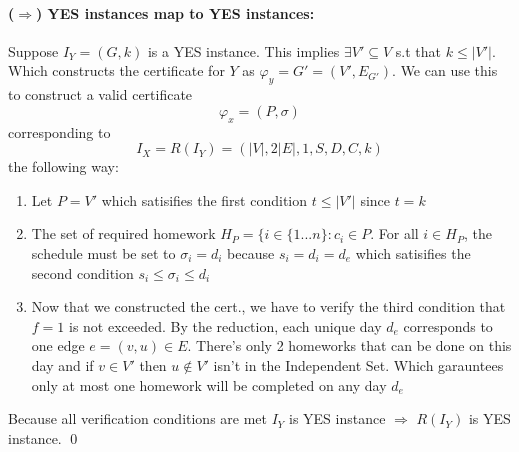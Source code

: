 \documentclass[11pt]{article}
\begin{document}
\paragraph{($\Rightarrow$) YES instances map to YES instances:}
Suppose $I_Y = (G,k)$ is a YES instance. This implies $\exists V' \subseteq V$ s.t that $k \leq |V'|$. Which constructs
the certificate for $Y$ as $\varphi_y = G' = (V', E_{G'})$.
We can use this to construct a valid certificate $$\varphi_x = (P,\sigma)$$ corresponding to $$I_X = R(I_Y) = (|V|, 2|E|, 1, S,D,C,k)$$ the following way:
\begin{enumerate}
    \item Let $P = V'$ which satisifies the first condition $t \leq |V'|$ since $t=k$
    \item The set of required homework $H_P = \{i \in \{1...n\}: c_i \in P$. For all $i\in H_P$, the schedule must be
            set to $\sigma_i=d_i$ because $s_i=d_i=d_e$ which satisifies the second condition $s_i \leq \sigma_i \leq d_i$
    \item Now that we constructed the cert.,  we have to verify the third condition that $f=1$ is not exceeded.
        By the reduction, each unique day $d_e$ corresponds to one edge $e=(v,u) \in E$. There's only 2 homeworks
        that can be done on this day and if $v\in V'$ then $u \notin V'$ isn't in the Independent Set. Which garauntees
        only at most one homework will be completed on any day $d_e$
\end{enumerate}
Because all verification conditions are met $I_Y$ is YES instance $\Rightarrow$ $R(I_Y)$ is YES instance. \qed
\end{document}
